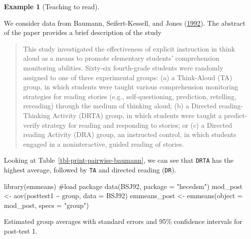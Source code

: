 \documentclass[
  11pt,
  letterpaper,
]{scrbook}
\newenvironment{Shaded}{\begin{snugshade}}{\end{snugshade}}
\newcommand{\AttributeTok}[1]{\textcolor[rgb]{0.40,0.45,0.13}{#1}}
\newcommand{\CommentTok}[1]{\textcolor[rgb]{0.37,0.37,0.37}{#1}}
\newcommand{\FunctionTok}[1]{\textcolor[rgb]{0.28,0.35,0.67}{#1}}
\newcommand{\NormalTok}[1]{\textcolor[rgb]{0.00,0.23,0.31}{#1}}
\newcommand{\OtherTok}[1]{\textcolor[rgb]{0.00,0.23,0.31}{#1}}
\newcommand{\SpecialCharTok}[1]{\textcolor[rgb]{0.37,0.37,0.37}{#1}}
\newcommand{\StringTok}[1]{\textcolor[rgb]{0.13,0.47,0.30}{#1}}
\theoremstyle{definition}
\newtheorem{example}{Example}[chapter]
\theoremstyle{remark}
\begin{document}
\begin{example}[Teaching to
read]\protect\hypertarget{exm-teachingtoread}{}\label{exm-teachingtoread}

We consider data from Baumann, Seifert-Kessell, and Jones
(\protect\hyperlink{ref-Baumann:1992}{1992}). The abstract of the paper
provides a brief description of the study

\begin{quote}
This study investigated the effectiveness of explicit instruction in
think aloud as a means to promote elementary students' comprehension
monitoring abilities. Sixty-six fourth-grade students were randomly
assigned to one of three experimental groups: (a) a Think-Aloud (TA)
group, in which students were taught various comprehension monitoring
strategies for reading stories (e.g., self-questioning, prediction,
retelling, rereading) through the medium of thinking aloud; (b) a
Directed reading-Thinking Activity (DRTA) group, in which students were
taught a predict-verify strategy for reading and responding to stories;
or (c) a Directed reading Activity (DRA) group, an instructed control,
in which students engaged in a noninteractive, guided reading of
stories.
\end{quote}

Looking at Table~\ref{tbl-print-pairwise-baumann}, we can see that
\texttt{DRTA} has the highest average, followed by \texttt{TA} and
directed reading (\texttt{DR}).

\begin{Shaded}
\begin{Highlighting}[]
\FunctionTok{library}\NormalTok{(emmeans) }\CommentTok{\#load package}
\FunctionTok{data}\NormalTok{(BSJ92, }\AttributeTok{package =} \StringTok{"hecedsm"}\NormalTok{)}
\NormalTok{mod\_post }\OtherTok{\textless{}{-}} \FunctionTok{aov}\NormalTok{(posttest1 }\SpecialCharTok{\textasciitilde{}}\NormalTok{ group, }\AttributeTok{data =}\NormalTok{ BSJ92)}
\NormalTok{emmeans\_post }\OtherTok{\textless{}{-}} \FunctionTok{emmeans}\NormalTok{(}\AttributeTok{object =}\NormalTok{ mod\_post, }
                        \AttributeTok{specs =} \StringTok{"group"}\NormalTok{)}
\end{Highlighting}
\end{Shaded}

\hypertarget{tbl-print-pairwise-baumann}{}
\begin{table}
\caption{\label{tbl-print-pairwise-baumann}Estimated group averages with standard errors and 95\% confidence
intervals for post-test 1. }\tabularnewline


\end{table}
\end{example}
\end{document}

